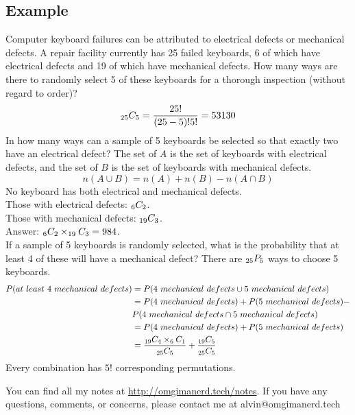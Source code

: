 \documentclass{math}
\begin{document}
\subsection*{Example}
Computer keyboard failures can be attributed to electrical defects or
mechanical defects. A repair facility currently has 25 failed keyboards, 6
of which have electrical defects and 19 of which have mechanical defects.
How many ways are there to randomly select 5 of these keyboards for a thorough
inspection (without regard to order)?
\[ _{25}C_{5} = \frac{25!}{(25-5)!5!} = 53130 \]
In how many ways can a sample of 5 keyboards be selected so that exactly two
have an electrical defect? The set of \( A \) is the set of keyboards with
electrical defects, and the set of \( B \) is the set of keyboards with
mechanical defects.
\[ n(A \cup B) = n(A) + n(B) - n(A \cap B) \]
No keyboard has both electrical and mechanical defects. \\
Those with electrical defects: \( _{6}C_{2} \). \\
Those with mechanical defects: \( _{19}C_{3} \). \\
Answer: \( _{6}C_{2} \times _{19}C_{3} = 984 \). \\
If a sample of 5 keyboards is randomly selected, what is the probability that
at least 4 of these will have a mechanical defect? There are \( _{25}P_{5} \)
ways to choose 5 keyboards. \\
\begin{align*}
  P(at\ least\ 4\ mechanical\ defects) &=
    P(4\ mechanical\ defects \cup 5\ mechanical\ defects) \\
  &= P(4\ mechanical\ defects)+P(5\ mechanical\ defects)- \\
  & P(4\ mechanical\ defects \cap 5\ mechanical\ defects) \\
  &= P(4\ mechanical\ defects)+P(5\ mechanical\ defects) \\
  &= \frac{_{19}C_{4}\times_{6}C_{1}}{_{25}C_{5}}+
    \frac{_{19}C_{5}}{_{25}C_{5}}
\end{align*}
Every combination has \( 5! \) corresponding permutations.

\begin{center}
  You can find all my notes at \url{http://omgimanerd.tech/notes}. If you have
  any questions, comments, or concerns, please contact me at
  alvin@omgimanerd.tech
\end{center}
\end{document}
